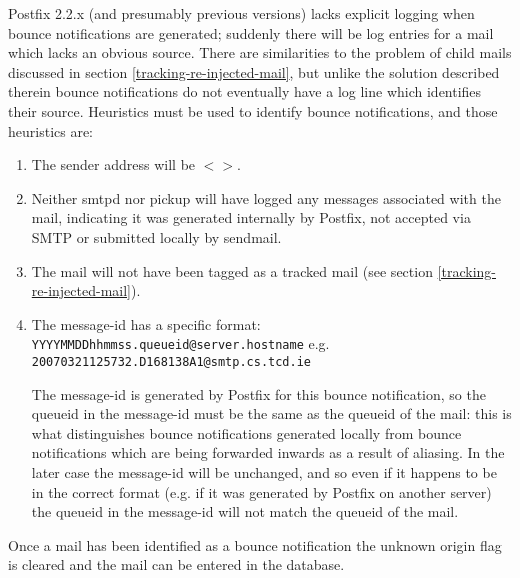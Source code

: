 \documentclass[a4paper,12pt,draft]{article}
\begin{document}
\label{identifying-bounce-notifications}

Postfix 2.2.x (and presumably previous versions) lacks explicit logging
when bounce notifications are generated; suddenly there will be log entries
for a mail which lacks an obvious source.  There are similarities to the
problem of child mails discussed in section
\ref{tracking-re-injected-mail}, but unlike the solution described therein
bounce notifications do not eventually have a log line which identifies
their source.  Heuristics must be used to identify bounce notifications,
and those heuristics are:

\begin{enumerate}

    \item The sender address will be $<>$.

    \item Neither smtpd nor pickup will have logged any messages associated
        with the mail, indicating it was generated internally by Postfix,
        not accepted via SMTP or submitted locally by sendmail.

    \item The mail will not have been tagged as a tracked mail (see section
        \ref{tracking-re-injected-mail}).

    \item The message-id has a specific format: \newline
        \texttt{YYYYMMDDhhmmss.queueid@server.hostname} \newline
        e.g. \texttt{20070321125732.D168138A1@smtp.cs.tcd.ie}

        The message-id is generated by Postfix for this bounce
        notification, so the queueid in the message-id must be the same as
        the queueid of the mail: this is what distinguishes bounce
        notifications generated locally from bounce notifications which are
        being forwarded inwards as a result of aliasing.  In the later case
        the message-id will be unchanged, and so even if it happens to be
        in the correct format (e.g. if it was generated by Postfix on
        another server) the queueid in the message-id will not match the
        queueid of the mail.

\end{enumerate}

Once a mail has been identified as a bounce notification the unknown origin
flag is cleared and the mail can be entered in the database.
\end{document}
